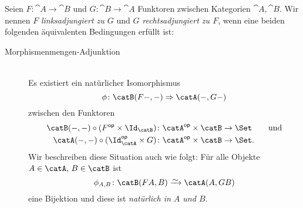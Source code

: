 \begin{thErinnerDef}
    Seien $F\colon \cat A\to\cat B$ und $G\colon \cat B\to \cat A$
    Funktoren zwischen Kategorien $\cat A, \cat B$. Wir nennen
    $F$ \emph{linksadjungiert zu $G$} und $G$ \emph{rechtsadjungiert zu $F$},
    wenn eine beiden folgenden äquivalenten Bedingungen erfüllt ist:

    \begin{description}
        \item[Morphismenmengen-Adjunktion]\hfill\\
            Es existiert ein natürlicher Isomorphismus 
            \[ \phi\colon \catB(F\blank,\blank)
                \nattrafoto \catA(\blank,G\blank)
            \]
            zwischen den Funktoren
            \begin{align*}
                \catB(\blank,\blank)\after(F\op\times\Id_\catB)&\colon
                \catA\op\times\catB\to\Set 
                \qquad\text{und}\\
                \catA(\blank,\blank)\after(\Id_\catA\op\times G)&\colon
                \catA\op\times\catB\to\Set
            . \end{align*}
            Wir beschreiben diese Situation auch wie folgt: Für alle Objekte
            $A\in\catA,\,B\in\catB$ ist
            \[ \phi_{A,B}\colon \catB(FA,B)\isorightarrow\catA(A,GB) \] 
            eine Bijektion und diese ist \emph{natürlich in $A$ und $B$}.


\end{description}
\end{thErinnerDef}
